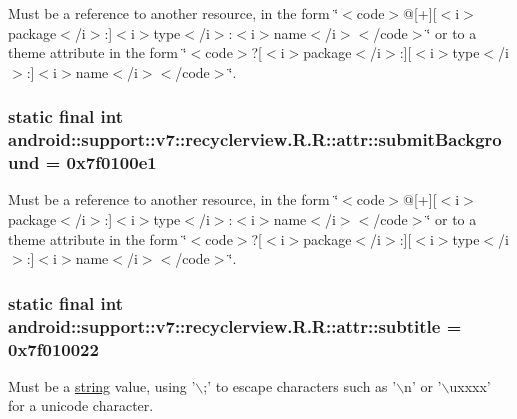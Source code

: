 Must be a reference to another resource, in the form \char`\"{}$<$code$>$@\mbox{[}+\mbox{]}\mbox{[}$<$i$>$package$<$/i$>$:\mbox{]}$<$i$>$type$<$/i$>$:$<$i$>$name$<$/i$>$$<$/code$>$\char`\"{} or to a theme attribute in the form \char`\"{}$<$code$>$?\mbox{[}$<$i$>$package$<$/i$>$:\mbox{]}\mbox{[}$<$i$>$type$<$/i$>$:\mbox{]}$<$i$>$name$<$/i$>$$<$/code$>$\char`\"{}. \hypertarget{classandroid_1_1support_1_1v7_1_1recyclerview_1_1_r_1_1attr_2bb926ff90482a0935b5968e81cf6b0e}{
\subsubsection[{submitBackground}]{\setlength{\rightskip}{0pt plus 5cm}static final int android::support::v7::recyclerview.R.R::attr::submitBackground = 0x7f0100e1}}
\label{classandroid_1_1support_1_1v7_1_1recyclerview_1_1_r_1_1attr_2bb926ff90482a0935b5968e81cf6b0e}


Must be a reference to another resource, in the form \char`\"{}$<$code$>$@\mbox{[}+\mbox{]}\mbox{[}$<$i$>$package$<$/i$>$:\mbox{]}$<$i$>$type$<$/i$>$:$<$i$>$name$<$/i$>$$<$/code$>$\char`\"{} or to a theme attribute in the form \char`\"{}$<$code$>$?\mbox{[}$<$i$>$package$<$/i$>$:\mbox{]}\mbox{[}$<$i$>$type$<$/i$>$:\mbox{]}$<$i$>$name$<$/i$>$$<$/code$>$\char`\"{}. \hypertarget{classandroid_1_1support_1_1v7_1_1recyclerview_1_1_r_1_1attr_dd0bd343e5cb7b5fe3216b9973876a01}{
\subsubsection[{subtitle}]{\setlength{\rightskip}{0pt plus 5cm}static final int android::support::v7::recyclerview.R.R::attr::subtitle = 0x7f010022}}
\label{classandroid_1_1support_1_1v7_1_1recyclerview_1_1_r_1_1attr_dd0bd343e5cb7b5fe3216b9973876a01}


Must be a \hyperlink{classandroid_1_1support_1_1v7_1_1recyclerview_1_1_r_1_1string}{string} value, using '$\backslash$;' to escape characters such as '$\backslash$n' or '$\backslash$uxxxx' for a unicode character. 

